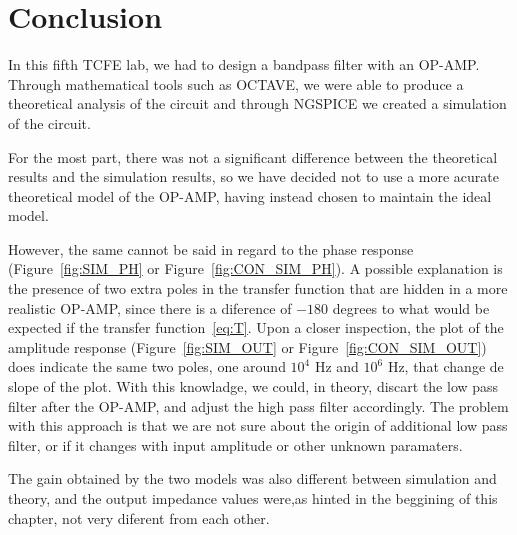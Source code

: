 \section{Conclusion}
\label{sec:conclusion}

In this fifth TCFE lab, we had to design a bandpass filter with an OP-AMP. Through mathematical tools such as OCTAVE, we were able to produce a theoretical analysis of the circuit and through NGSPICE we created a simulation of the circuit.

For the most part, there was not a significant difference between the theoretical results and the simulation results, so we have decided not to use a more acurate theoretical model of the OP-AMP, having instead chosen to maintain the ideal model. \par
However, the same cannot be said in regard to the phase response (Figure~\ref{fig:SIM_PH} or Figure~\ref{fig:CON_SIM_PH}). A possible explanation is the presence of two extra poles in the transfer function that are hidden in a more realistic OP-AMP, since there is a diference of $-180$ degrees to what would be expected if the transfer function~\ref{eq:T}.
Upon a closer inspection, the plot of the amplitude response (Figure~\ref{fig:SIM_OUT} or Figure~\ref{fig:CON_SIM_OUT}) does indicate the same two poles, one around $10^{4}$ Hz and $10^{6}$ Hz, that change de slope of the plot.
With this knowladge, we could, in theory, discart the low pass filter after the OP-AMP, and adjust the high pass filter accordingly. The problem with this approach is that we are not sure about the origin of additional low pass filter, or if it changes with input amplitude or other unknown paramaters.

The gain obtained by the two models was also different between simulation and theory, and the output impedance values were,as hinted in the beggining of this chapter, not very diferent from each other.


